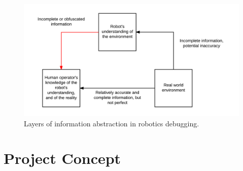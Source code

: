 \begin{figure}
	\centering
	\includegraphics{Figures/RobotDebuggingInformationAbstraction.png}
	\decoRule
	\caption[Debugging Information]{Layers of information abstraction in robotics debugging.}
	\label{fig:DebuggingInformation}
\end{figure}


\section{Project Concept}

